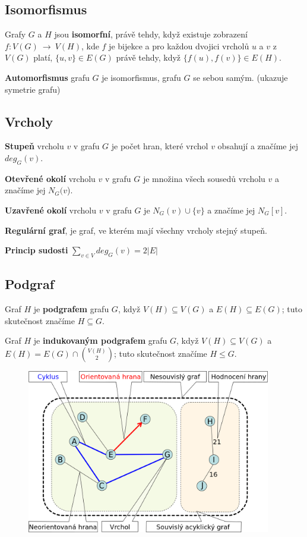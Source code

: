 \documentclass{szzclass}
\begin{document}
\subsection{Isomorfismus}
Grafy $G$ a $H$ jsou \textbf{isomorfní}, právě tehdy, když existuje zobrazení $f:V(G)~\rightarrow~V(H)$, kde $f$ je bijekce a pro každou dvojici vrcholů $u$ a $v$ z $V(G)$ platí, $\{u,v\} \in E(G)$ právě tehdy, když $\{f(u), f(v)\} \in E(H)$.

\textbf{Automorfismus} grafu $G$ je isomorfismus, grafu $G$ se sebou samým. (ukazuje symetrie grafu)

\subsection{Vrcholy}

\textbf{Stupeň} vrcholu $v$ v grafu $G$ je počet hran, které vrchol $v$ obsahují a značíme jej $deg_G(v)$.

\textbf{Otevřené okolí} vrcholu $v$ v grafu $G$ je množina všech sousedů vrcholu $v$ a značíme jej $N_G(v$).

\textbf{Uzavřené okolí} vrcholu $v$ v grafu $G$ je $N_G(v) \cup \{v\}$ a značíme jej $N_G[v]$.

\textbf{Regulární graf}, je graf, ve kterém mají všechny vrcholy stejný stupeň.

\textbf{Princip sudosti} $\sum_{v \in V} deg_G(v) = 2|E|$

\subsection{Podgraf}
Graf $H$ je \textbf{podgrafem} grafu $G$, když $V(H) \subseteq V(G)$ a
$E(H) \subseteq E(G)$; tuto skutečnost značíme $H \subseteq G$.

Graf $H$ je \textbf{indukovaným podgrafem} grafu $G$, když $V(H) \subseteq V(G)$ a $E(H) = E(G) \cap \binom{V(H)}{2}$; tuto skutečnost značíme $H \leq G$.



\begin{figure}[h]
\includegraphics[width=0.95\textwidth]{topics/bi-spol-4/images/graf.png}
\end{figure}
\end{document}
